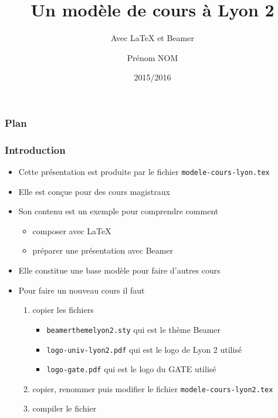\documentclass[10pt,t]{beamer}
\title{Un modèle de cours à Lyon 2}
\subtitle{Avec \LaTeX{} et Beamer}
\author{Prénom NOM}
\institute{Université Lyon 2 \and CNRS}
\date{2015/2016}
\begin{document}
\begin{frame}[plain,label=titre]
  \titlepage
\end{frame}

\begin{frame}
  \frametitle{Plan}
  \tableofcontents
\end{frame}


\begin{frame}[fragile]%
  \frametitle{Introduction}


  \begin{itemize}
  \item Cette présentation est produite par le fichier \verb|modele-cours-lyon.tex|
  \item Elle est conçue pour des cours magistraux
  \item Son contenu est un exemple pour comprendre comment

    \begin{itemize}
    \item composer avec \LaTeX{}
    \item préparer une présentation avec Beamer
    \end{itemize}
  \end{itemize}

  \pause


  \begin{itemize}
  \item Elle constitue une base modèle pour faire d'autres cours
  \item Pour faire un nouveau cours il faut 
    
    \begin{enumerate}
    \item copier les fichiers 

      \begin{itemize}
      \item \verb|beamerthemelyon2.sty| qui est le thème Beamer
      \item \verb|logo-univ-lyon2.pdf| qui est le logo de Lyon 2 utilisé
      \item \verb|logo-gate.pdf| qui est le logo du GATE utilisé
      \end{itemize}

    \item copier, renommer puis modifier le fichier \verb|modele-cours-lyon2.tex|
    \item compiler le fichier
    \end{enumerate}
  \end{itemize}

  \pause

\end{frame}
\end{document}
